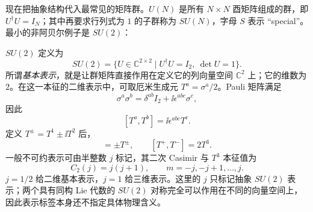 现在把抽象结构代入最常见的矩阵群。$U(N)$ 是所有 $N\times N$ 酉矩阵组成的群，即 $U^\dagger U=I_N$；其中再要求行列式为 $1$ 的子群称为 $SU(N)$，字母 $S$ 表示 ``special''。最小的非阿贝尔例子是 $SU(2)$：

$SU(2)$ 定义为
\begin{equation*}
 SU(2)=\{U\in\mathbb C^{2\times2}\mid U^\dagger U=I_2,\ \det U=1\}.
\end{equation*}
所谓\emph{基本表示}，就是让群矩阵直接作用在定义它的列向量空间 $\mathbb C^2$ 上；它的维数为 $2$。在这一本征的二维表示中，可取厄米生成元 $T^a=\sigma^a/2$。Pauli 矩阵满足
\begin{equation}
 \sigma^a\sigma^b
 =\delta^{ab}I_2+\ii\epsilon^{abc}\sigma^c,
 \label{eq:pauli-product-lie-dp68}
\end{equation}
因此
\begin{equation}
 {[T^a,T^b]=\ii\epsilon^{abc}T^c.}
 \label{eq:su2-algebra-dp11}
\end{equation}
定义 $T^\pm=T^1\pm\ii T^2$ 后，
\begin{equation}
 [T^3,T^\pm]=\pm T^\pm,
 \qquad [T^+,T^-]=2T^3.
 \label{eq:su2-ladder-algebra-dp11}
\end{equation}
一般不可约表示可由半整数 $j$ 标记，其二次 Casimir 与 $T^3$ 本征值为
\begin{equation}
 {
 C_2(j)=j(j+1),
 \qquad m=-j,-j+1,\ldots,j.}
 \label{eq:su2-casimir-dp11}
\end{equation}
$j=1/2$ 给二维基本表示，$j=1$ 给三维表示。这里的 $j$ 只标记抽象 $SU(2)$ 表示；两个具有同构 Lie 代数的 $SU(2)$ 对称完全可以作用在不同的向量空间上，因此表示标签本身还不指定具体物理含义。

